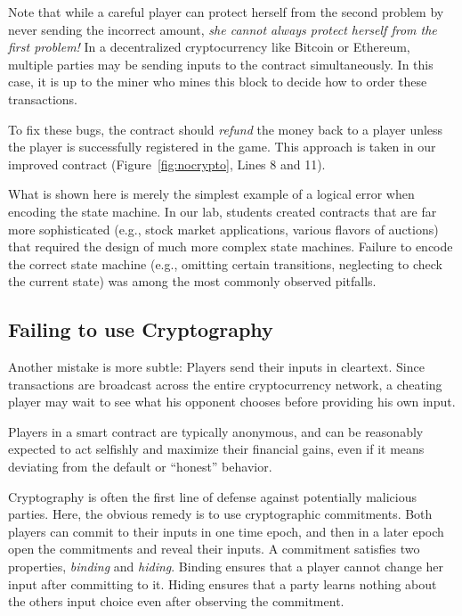 \documentclass[10pt,twocolumn,letterpaper]{article}
\newcommand{\elaine}[1]{}
\begin{document}
Note that while a careful player 
can protect herself from the second problem by never sending the incorrect amount,
{\it she cannot always protect 
herself from the first problem!}
In a decentralized cryptocurrency
like Bitcoin or Ethereum, 
multiple parties may be sending inputs 
to the contract simultaneously.
In this case, it is up to the miner who mines this block
to decide how to order these transactions.

To fix these bugs, the contract
should \emph{refund} the money back to
a player unless the player is successfully registered in the game.
This approach is taken in our improved contract (Figure~\ref{fig:nocrypto}, Lines 8 and 11).


What is shown here is merely the simplest example 
of a logical error when encoding the state machine.
In our lab, students created contracts that are far more
sophisticated (e.g., stock market 
applications, various flavors of auctions)
that required the design of much more 
complex state machines.
Failure to encode the correct state machine (e.g., 
omitting certain transitions, neglecting
to check the current state)  
was among the most commonly observed pitfalls. 


\subsection{Failing to use Cryptography}
Another mistake is more subtle:
Players
send their inputs in cleartext. Since transactions are broadcast across the entire cryptocurrency network, a cheating player may wait to see what his opponent chooses before providing his own input.

Players in a smart contract are typically anonymous, and can be reasonably expected to act selfishly and maximize their financial gains, even if it means deviating from the default or ``honest'' behavior.

Cryptography is often the first line of defense against potentially malicious parties. 
Here, the obvious remedy is to use
cryptographic commitments.
Both players can commit to their inputs in one time epoch,
and then in a later epoch open the commitments and reveal their inputs.
A commitment satisfies two properties, {\it binding} and {\it hiding}.
Binding ensures that a player cannot change her input
after committing to it. Hiding ensures
that a party learns nothing about the others input choice even after observing the commitment.
\end{document}
